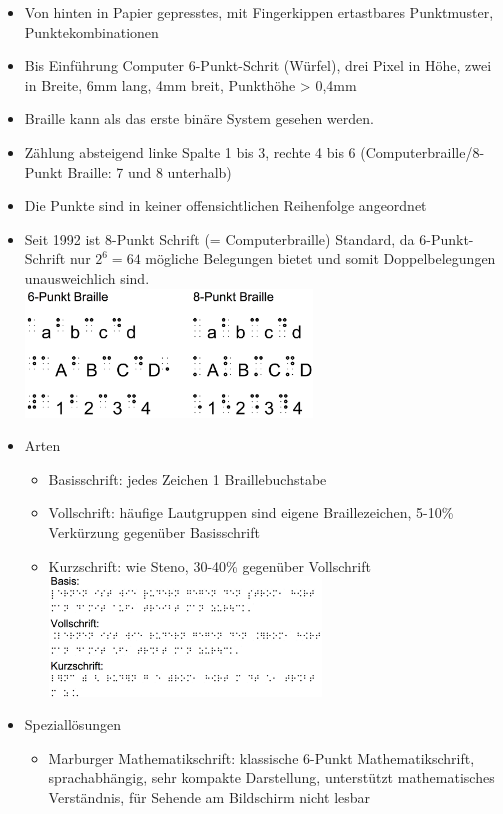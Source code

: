 \documentclass[paper=a4, fontsize=11pt]{scrartcl} %
\numberwithin{equation}{section} %
\numberwithin{figure}{section} %
\numberwithin{table}{section} %
\begin{document}
\begin{itemize}
\item Von hinten in Papier gepresstes, mit Fingerkippen ertastbares Punktmuster, Punktekombinationen
\item Bis Einführung Computer 6-Punkt-Schrit (Würfel), drei Pixel in Höhe, zwei in Breite, 6mm lang, 4mm breit, Punkthöhe > 0,4mm
\item Braille kann als das erste binäre System gesehen werden.
\item Zählung absteigend linke Spalte 1 bis 3, rechte 4 bis 6 (Computerbraille/8-Punkt Braille: 7 und 8 unterhalb)
\item Die Punkte sind in keiner offensichtlichen Reihenfolge angeordnet
\item Seit 1992 ist 8-Punkt Schrift (= Computerbraille) Standard, da 6-Punkt-Schrift nur $2^6 = 64$ mögliche Belegungen bietet und somit Doppelbelegungen unausweichlich sind.\\ 
\includegraphics[width=0.6\textwidth]{imgs/braille6v8}
\item Arten
\begin{itemize}
\item Basisschrift: jedes Zeichen 1 Braillebuchstabe
\item Vollschrift: häufige Lautgruppen sind eigene Braillezeichen, 5-10\% Verkürzung gegenüber Basisschrift
\item Kurzschrift: wie Steno, 30-40\% gegenüber Vollschrift\\
\includegraphics[width=0.6\textwidth]{imgs/braillearten}
\end{itemize}
\item Speziallösungen
\begin{itemize}
\item Marburger Mathematikschrift: klassische 6-Punkt Mathematikschrift, sprachabhängig, sehr kompakte Darstellung, unterstützt mathematisches Verständnis, für Sehende am Bildschirm nicht lesbar

\end{itemize}
\end{itemize}
\end{document}
